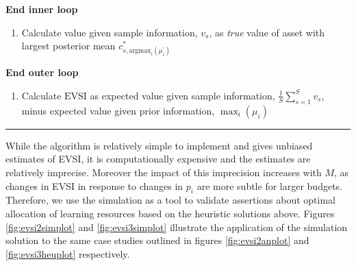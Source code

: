 \documentclass[]{article}
\providecommand{\tightlist}{%
  \setlength{\itemsep}{0pt}\setlength{\parskip}{0pt}}
\theoremstyle{definition}
\theoremstyle{definition}
\theoremstyle{remark}
\begin{document}
\textbf{End inner loop}

\begin{enumerate}
\def\labelenumi{\arabic{enumi}.}
\setcounter{enumi}{3}
\tightlist
\item
  Calculate value given sample information, \(v_s\), as \emph{true}
  value of asset with largest posterior mean
  \(c^*_{s,\mathrm{argmax}_i(\mu^\prime_i)}\)
\end{enumerate}

\textbf{End outer loop}

\begin{enumerate}
\def\labelenumi{\arabic{enumi}.}
\setcounter{enumi}{4}
\tightlist
\item
  Calculate \(\mathrm{EVSI}\) as expected value given sample
  information, \(\frac{1}{S}\sum\limits_{s = 1}^{S} v_s\), minus
  expected value given prior information, \(\max_i({\mu_i})\)
\end{enumerate}

\begin{center}\rule{0.5\linewidth}{\linethickness}\end{center}

While the algorithm is relatively simple to implement and gives unbiased
estimates of EVSI, it is computationally expensive and the estimates are
relatively imprecise. Moreover the impact of this imprecision increases
with \(M\), as changes in EVSI in response to changes in \(p_i\) are
more subtle for larger budgets. Therefore, we use the simulation as a
tool to validate assertions about optimal allocation of learning
resources based on the heuristic solutions above. Figures
\ref{fig:evsi2simplot} and \ref{fig:evsi3simplot} illustrate the
application of the simulation solution to the same case studies outlined
in figures \ref{fig:evsi2anplot} and \ref{fig:evsi3heuplot}
respectively.
\end{document}

